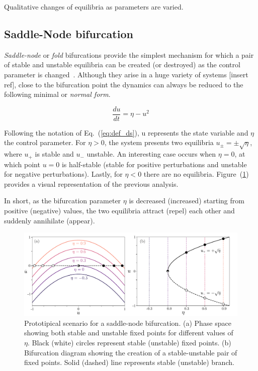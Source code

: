 Qualitative changes of equilibria as parameters are varied.


\subsection{Saddle-Node bifurcation}

{\em Saddle-node} or {\em fold} bifurcations provide the simplest mechanism 
for which a pair of stable and unstable equilibria can be created (or destroyed) 
as the control parameter is changed~\cite{strogatz2018nonlinear}. Although they arise in a huge variety of systems 
[insert ref], close to the bifurcation point the dynamics can always be reduced to
the following minimal or {\em normal form}.

\begin{equation}
    \dfrac{du}{dt} = \eta - u^2
    \label{eq:pre_bif_sn}
\end{equation}

Following the notation of Eq.~(\ref{eq:def_ds}), u represents the state variable
and $\eta$ the control parameter. For $\eta > 0$, the system presents two equilibria $u_{\pm} = \pm\sqrt{\eta}$, where $u_+$ is
stable and $u_-$ unstable. An interesting case occurs when $\eta = 0$, at which point $u = 0$ is
half-stable (stable for positive perturbations and unstable for negative perturbations). Lastly,
for $\eta < 0$ there are no equilibria. Figure~(\ref{fig:pre_bifs_sn}) provides a visual representation
of the previous analysis.

In short, as the bifurcation parameter $\eta$ is decreased (increased)
starting from positive (negative) values, the two equilibria attract (repel) each other and suddenly annihilate (appear).

\begin{figure}[h]
    \centering
    \includegraphics[width=\textwidth]{imagenes/framework/bif_sn_f.pdf}
    \caption{Prototipical scenario for a saddle-node bifurcation. (a) Phase space
    showing both stable and unstable fixed points for different values of $\eta$. 
    Black (white) circles represent
    stable (unstable) fixed points. (b) Bifurcation diagram showing
    the creation of a stable-unstable pair of fixed points. Solid (dashed) line represents
    stable (unstable) branch.}
    \label{fig:pre_bifs_sn}
\end{figure}

